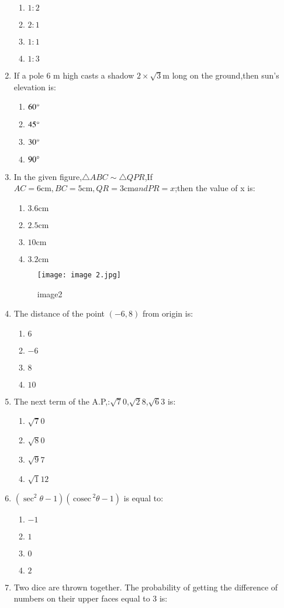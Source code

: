 \documentclass[12pt,-letter paper]{article}
\providecommand{\brak}[1]{\ensuremath{\left(#1\right)}}
\newcommand{\cosec}{\,\text{cosec}\,}
\begin{document}
\begin{enumerate}
	\begin{enumerate}
	\item $1:2$
	\item $2:1$
	\item $1:1$
	\item $1:3$
\end{enumerate}
\item If a pole 6 m high casts a shadow $2 \times \sqrt{3}$m long on the ground,then sun's elevation is:
	\begin{enumerate}
	\item $60\degree$
	\item $45\degree$
	\item $30\degree$
	\item $90\degree$
	\end{enumerate}
\item In the given figure,$\triangle ABC \sim \triangle QPR$,If $AC = 6\mathrm{cm},BC = 5 \mathrm{cm},QR = 3\mathrm{cm}  and PR = x$;then the value of  x is:
	\begin{enumerate}
	\item $3.6 \mathrm{cm}$
	\item $2.5\mathrm{cm}$
	\item $10 \mathrm{cm}$
	\item $3.2 \mathrm{cm}$
	\end{enumerate}
	\begin{figure}[!ht]
\centering
\texttt{[image: image 2.jpg]}
\label{fig:image1}
	\caption{image2}
\end{figure}
\item The distance of the point $\brak{-6,8}$ from origin is:
	\begin{enumerate}
	\item $6$
	\item $-6$
	\item $8$
	\item $10$
\end{enumerate}
\item The next term of the A.P,:$\sqrt 70$,$\sqrt 28$,$\sqrt 63$ is:
	\begin{enumerate}
        \item $\sqrt 70$
	\item $\sqrt 80$
	\item $\sqrt 97$
	\item $\sqrt 112$
\end{enumerate}
\item $ (\sec^2 \theta - 1)(\cosec^2 \theta - 1)$
is equal to:
\begin{enumerate}
	\item $-1$
	\item $1$
	\item $0$
	\item $2$
\end{enumerate}
\item  Two dice are thrown together. The probability of getting the difference of numbers on their upper faces equal to 3 is:


\end{enumerate}
\end{document}
